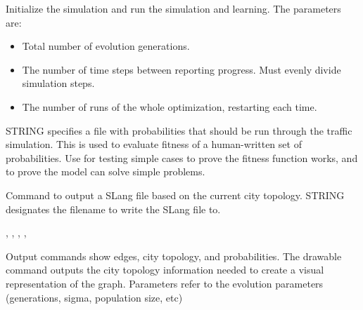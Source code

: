 \documentclass[11pt]{article}
\begin{document}
\begin{enumerate}
\production {} \arr {}   

Initialize the simulation and run the simulation and learning.   The parameters are:
\begin{itemize}
\item Total number of evolution generations.
\item The number of time steps between reporting progress. Must evenly divide simulation steps.
\item The number of runs of the whole optimization, restarting each time.
\end{itemize}

\production {} \arr {} 

STRING specifies a file with probabilities that should be run through the traffic simulation. This is used to evaluate fitness of a human-written set of probabilities. Use for testing simple cases to prove the fitness function works, and to prove the model can solve simple problems. 

\production {} \arr {} 

Command to output a SLang file based on the current city topology. STRING designates the filename to write the SLang file to.





\production {} \arr {} \sep {} \sep {} \sep {} \sep {}

Output commands show edges, city topology, and probabilities. The drawable command outputs the city topology information needed to create a visual representation of the graph. Parameters refer to the evolution parameters (generations, sigma, population size, etc)


\end{enumerate}
\end{document}
